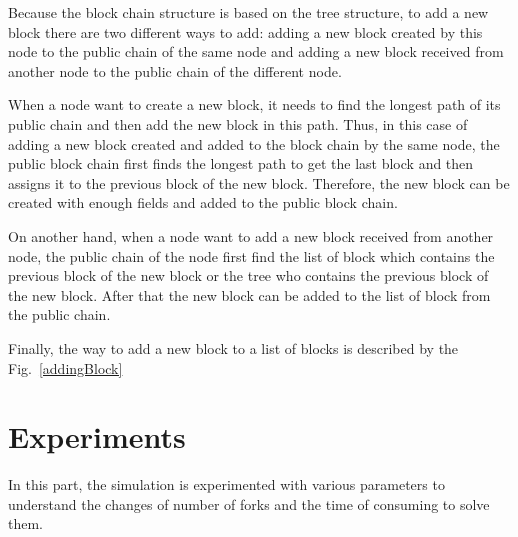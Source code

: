 \documentclass[runningheads,a4paper]{llncs}
\begin{document}
Because the block chain structure is based on the tree structure, to add a new block there are two different ways to add: adding a new block created by this node to the public chain of the same node and adding a new block received from another node to the public chain of the different node.

When a node want to create a new block, it needs to find the longest path of its public chain and then add the new block in this path.
Thus, in this case of adding a new block created and added to the block chain by the same node, the public block chain first finds the longest path to get the last block and then assigns it to the previous block of the new block.
Therefore, the new block can be created with enough fields and added to the public block chain.

On another hand, when a node want to add a new block received from another node, the public chain of the node first find the list of block which contains the previous block of the new block or the tree who contains the previous block of the new block.
After that the new block can be added to the list of block from the public chain.

Finally, the way to add a new block to a list of blocks is described by the Fig.~\ref{addingBlock} 


\section{Experiments}
\label{Exper}
In this part, the simulation is experimented with various parameters to understand the changes of number of forks and the time of consuming to solve them.
\end{document}
